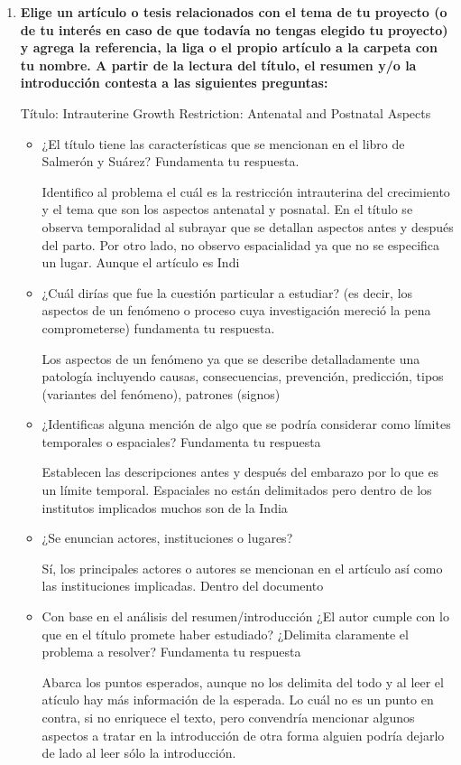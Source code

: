 \begin{enumerate}
	\item \textbf{Elige un artículo o tesis relacionados con el tema de tu proyecto (o de tu interés en caso de que todavía
no tengas elegido tu proyecto) y agrega la referencia, la liga o el propio artículo a la carpeta con tu
nombre. A partir de la lectura del título, el resumen y/o la introducción contesta a las siguientes
preguntas:}

Título: Intrauterine Growth Restriction: Antenatal and Postnatal
Aspects

	\begin{itemize}
		\item ¿El título tiene las características que se mencionan en el libro de Salmerón y Suárez?
Fundamenta tu respuesta.
		
				Identifico al problema el cuál es la restricción
				intrauterina del crecimiento y el tema que son 
				los aspectos antenatal y posnatal. En el título
				se observa temporalidad al subrayar que se
				detallan aspectos antes y después del parto.
				Por otro lado, no observo espacialidad ya que no
				se especifica un lugar. Aunque el artículo es Indi
		
		\item ¿Cuál dirías que fue la cuestión particular a estudiar? (es decir, los aspectos de un fenómeno o
proceso cuya investigación mereció la pena comprometerse) fundamenta tu respuesta.

		Los aspectos de un fenómeno ya que se describe
		detalladamente una patología incluyendo causas,
		consecuencias, prevención, predicción, tipos (variantes
		del fenómeno), patrones (signos)

		\item ¿Identificas alguna mención de algo que se podría considerar como límites temporales o
espaciales? Fundamenta tu respuesta
		
		Establecen las descripciones antes y después del embarazo
		por lo que es un límite temporal. Espaciales no están
		delimitados pero dentro de los institutos implicados 
		muchos son de la India
		
		\item ¿Se enuncian actores, instituciones o lugares?
		
		Sí, los principales actores o autores se mencionan en el
		artículo así como las instituciones implicadas. Dentro del
		documento
		
		\item Con base en el análisis del resumen/introducción ¿El autor cumple con lo que en el título
promete haber estudiado? ¿Delimita claramente el problema a resolver? Fundamenta tu respuesta
		
		Abarca los puntos esperados, aunque no los delimita del
		todo y al leer el atículo hay más información de la
		esperada. Lo cuál no es un punto en contra, si no
		enriquece el texto, pero convendría mencionar algunos
		aspectos a tratar en la introducción de otra forma 
		alguien podría dejarlo de lado al leer sólo la
		introducción.

	\end{itemize}
\end{enumerate}




